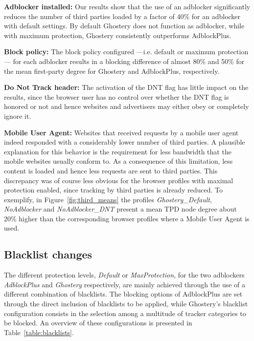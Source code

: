 \vspace{0.5 em}\noindent \textbf{Adblocker installed:} Our results show that the use of an adblocker significantly reduces the number of third parties loaded by a factor of 40\% for an adblocker with default settings. By default Ghostery does not function as adblocker, while with maximum protection, Ghostery consistently outperforms AdblockPlus.

\vspace{0.5 em}\noindent \textbf{Block policy:} The block policy configured ---i.e. default or maximum protection--- for each adblocker results in a blocking difference of almost 80\% and 50\% for the mean first-party degree for Ghostery and AdblockPlus, respectively.

\vspace{0.5 em}\noindent \textbf{Do Not Track header:} The activation of the DNT flag has little impact on the results, since the browser user has no control over whether the DNT flag is honored or not and hence websites and advertisers may either obey or completely ignore it.

\vspace{0.5 em}\noindent \textbf{Mobile User Agent:} Websites that received requests by a mobile user agent indeed responded with a considerably lower number of third parties. A plausible explanation for this behavior is the requirement for less bandwidth that the mobile websites usually conform to. As a consequence of this limitation, less content is loaded and hence less requests are sent to third parties. This discrepancy was of course less obvious for the browser profiles with maximal protection enabled, since tracking by third parties is already reduced. To exemplify, in Figure~\ref{fig:third_means} the profiles \textit{Ghostery\_Default}, \textit{NoAdblocker} and \textit{NoAdblocker\_DNT} present a mean TPD node degree about 20\% higher than the corresponding browser profiles where a Mobile User Agent is used.

\subsection{Blacklist changes}
The different protection levels, \textit{Default} or \textit{MaxProtection}, for the two adblockers \textit{AdblockPlus} and \textit{Ghostery} respectively, are mainly achieved through the use of a different combination of blacklists. The blocking options of AdblockPlus are set through the direct inclusion of blacklists to be applied, while  Ghostery's blacklist configuration consists in the selection among a multitude of tracker categories to be blocked. An overview of these configurations is presented in Table~\ref{table:blacklists}.

